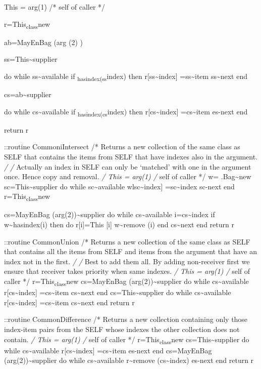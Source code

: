 This = arg(1) /* self of caller */

r=This\textsubscript{class}new

ab=MayEnBag (arg (2) )

ss=This\textasciitilde supplier

do while ss\textasciitilde available if
\ab\textsubscript{hasindex(ss}index) then r{[}ss\textasciitilde index{]}
=ss\textasciitilde item ss\textasciitilde next end

cs=ab\textasciitilde supplier

do while cs\textasciitilde available if
\This\textsubscript{hasindex(cs}index) then
r{[}cs\textasciitilde index{]} =cs\textasciitilde item es-next end

return r

::routine CommoniIntersect /* Returns a new collection of the same class
as SELF that contains the items from SELF that have indexes also in the
argument. \emph{/ /} Actually an index in SELF can only be `matched'
with one in the argument once. Hence copy and removal. \emph{/ This =
arg(1) /} self of caller */ w= .Bag\textasciitilde new
sc=This\textasciitilde supplier do while sc\textasciitilde available
wlsc\textasciitilde index{]} =sc\textasciitilde index sc-next end
r=This\textsubscript{class}new

cs=MayEnBag (arg(2))\textasciitilde supplier do while
cs\textasciitilde available i=cs\textasciitilde index if
w\textasciitilde hasindex(i) then do r{[}i{]}=This {[}i{]}
w\textasciitilde remove (i) end cs\textasciitilde next end return r

::routine CommonUnion /* Returns a new collection of the same class as
SELF that contains all the items from SELF and items from the argument
that have an index not in the first. \emph{/ /} Best to add them all. By
adding non-receiver first we ensure that receiver takes priority when
same indexes. \emph{/ This = arg(1) /} self of caller */
r=This\textsubscript{class}new cs=MayEnBag
(arg(2))\textasciitilde supplier do while cs\textasciitilde available
r{[}cs\textasciitilde index{]} =cs\textasciitilde item
cs\textasciitilde next end cs=This\textasciitilde supplier do while
cs\textasciitilde available r{[}cs\textasciitilde index{]}
=cs\textasciitilde item cs\textasciitilde next end return r

::routine CommonDifference /* Returns a new collection containing only
those index-item pairs from the SELF whose indexes the other collection
does not contain. \emph{/ This = arg(1) /} self of caller */
r=This\textsubscript{class}new cs=This\textasciitilde supplier do while
cs\textasciitilde available r{[}cs\textasciitilde index{]}
=cs\textasciitilde item es-next end cs=MayEnBag
(arg(2))\textasciitilde supplier do while cs\textasciitilde available
r\textasciitilde remove (cs\textasciitilde index) es-next end return r

